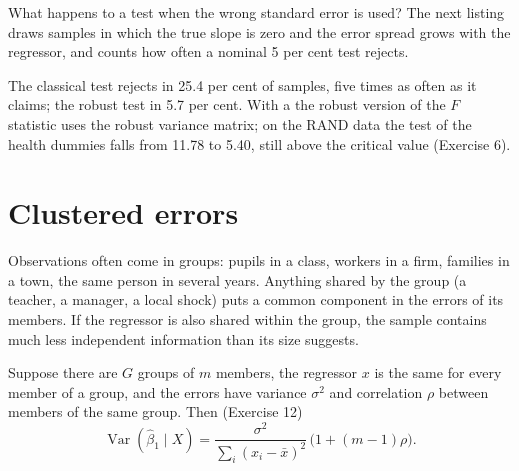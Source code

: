 \label{out:b2:regression-inference:robust}

What happens to a test when the wrong standard error is used? The next listing draws samples in which the true slope is
zero and the error spread grows with the regressor, and counts how often a nominal 5 per cent test rejects.

\label{lst:b2:regression-inference:size}

\label{out:b2:regression-inference:size}

The classical test rejects in 25.4 per cent of samples, five times as often as it claims; the robust test in 5.7 per cent.
With a  the robust version of the $F$ statistic uses the robust variance matrix; on the RAND data the
test of the health dummies falls from 11.78 to 5.40, still above the critical value (Exercise 6).

\section{Clustered errors}\label{sec:b2:regression-inference:cluster}

Observations often come in groups: pupils in a class, workers in a firm, families in a town, the same person in several
years. Anything shared by the group (a teacher, a manager, a local shock) puts a common component in the errors of its
members. If the regressor is also shared within the group, the sample contains much less independent information than its
size suggests.

Suppose there are $G$ groups of $m$ members, the regressor $x$ is the same for every member of a group, and the errors
have variance $\sigma^2$ and correlation $\rho$ between members of the same group. Then (Exercise 12)
\begin{equation}\label{eq:b2:regression-inference:moulton}
\operatorname{Var}(\hat\beta_1 \mid X) = \frac{\sigma^2}{\sum_i(x_i - \bar x)^2}\,\bigl(1 + (m - 1)\rho\bigr).
\end{equation}

